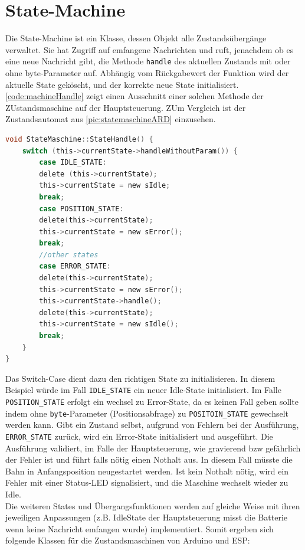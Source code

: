 \section{State-Machine}
Die State-Machine ist ein Klasse, dessen Objekt alle Zustandsübergänge verwaltet. Sie hat Zugriff auf emfangene Nachrichten und ruft, jenachdem ob es eine neue Nachricht gibt, die Methode \texttt{handle} des aktuellen Zustands mit oder ohne byte-Parameter auf. Abhängig vom Rückgabewert der Funktion wird der aktuelle State geköscht, und der korrekte neue State initialisiert. \autoref{code:machineHandle} zeigt einen Ausschnitt einer solchen Methode der ZUstandsmaschine auf der Hauptsteuerung. ZUm Vergleich ist der Zustandsautomat aus \autoref{pic:statemaschineARD} einzusehen.
\vspace{0.5cm}
\begin{lstlisting}[language=c, style=dhpaperdefault]
void StateMaschine::StateHandle() { 
	switch (this->currentState->handleWithoutParam()) {
		case IDLE_STATE:
		delete (this->currentState);
		this->currentState = new sIdle;
		break;
		case POSITION_STATE:
		delete(this->currentState);
		this->currentState = new sError();
		break;
		//other states
		case ERROR_STATE:
		delete(this->currentState);
		this->currentState = new sError();
		this->currentState->handle();
		delete(this->currentState);
		this->currentState = new sIdle();
		break;
	}
}
\end{lstlisting}

Das Switch-Case dient dazu den richtigen State zu initialisieren. In diesem Beispiel würde im Fall \texttt{IDLE\_STATE} ein neuer Idle-State initialisiert. Im Falle \texttt{POSITION\_STATE} erfolgt ein wechsel zu Error-State, da es keinen Fall geben sollte indem ohne \texttt{byte}-Parameter (Positionsabfrage) zu \texttt{POSITOIN\_STATE} gewechselt werden kann. Gibt ein Zustand selbst, aufgrund von Fehlern bei der Ausführung, \texttt{ERROR\_STATE} zurück, wird ein Error-State initialisiert und ausgeführt. Die Ausführung validiert, im Falle der Hauptsteuerung, wie gravierend bzw gefährlich der Fehler ist und führt falls nötig einen Nothalt aus. In diesem Fall müsste die Bahn in Anfangsposition neugestartet werden. Ist kein Nothalt nötig, wird ein Fehler mit einer Status-LED signalisiert, und die Maschine wechselt wieder zu Idle. 
\\ Die weiteren States und Übergangsfunktionen werden auf gleiche Weise mit ihren jeweiligen Anpassungen (z.B. IdleState der Hauptsteuerung misst die Batterie wenn keine Nachricht emfangen wurde) implementiert. Somit ergeben sich folgende Klassen für die Zustandsmaschinen von Arduino und ESP:

